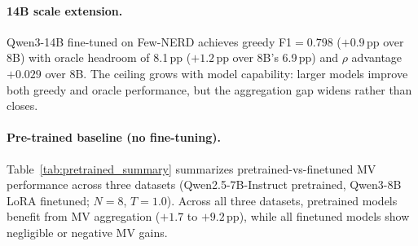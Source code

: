 \paragraph{14B scale extension.}
Qwen3-14B fine-tuned on Few-NERD achieves greedy F1${=}0.798$ ($+0.9$\,pp over 8B) with oracle headroom of 8.1\,pp ($+1.2$\,pp over 8B's 6.9\,pp) and $\rho$ advantage $+0.029$ over 8B.
The ceiling grows with model capability: larger models improve both greedy and oracle performance, but the aggregation gap widens rather than closes.

\paragraph{Pre-trained baseline (no fine-tuning).}
Table~\ref{tab:pretrained_summary} summarizes pretrained-vs-finetuned MV performance across three datasets (Qwen2.5-7B-Instruct pretrained, Qwen3-8B LoRA finetuned; $N{=}8$, $T{=}1.0$).
Across all three datasets, pretrained models benefit from MV aggregation ($+1.7$ to $+9.2$\,pp), while all finetuned models show negligible or negative MV gains.

\begin{table}[t]
\centering
\small
\caption{Pretrained vs.\ finetuned MV ($T{=}1.0$). Pretrained: Qwen2.5-7B-Instruct; finetuned: Qwen3-8B LoRA ($N{=}8$ unless noted). MV: strict majority ($>N/2$). Capture: $\text{MV}\,\Delta / \text{oracle headroom}$. CoNLL pretrained single-seed; others 3-seed mean${\pm}\sigma$ ($N{=}8$) or single-seed ($N{=}16{,}32$).}
\label{tab:pretrained_summary}
\end{table}

